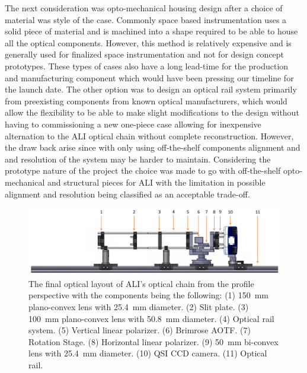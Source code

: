 The next consideration was opto-mechanical housing design after a choice of material was style of the case. Commonly space based instrumentation uses a solid piece of material and is machined into a shape required to be able to house all the optical components. However, this method is relatively expensive and is generally used for finalized space instrumentation and not for design concept prototypes. These types of cases also have a long lead-time for the production and manufacturing component which would have been pressing our timeline for the launch date. The other option was to design an optical rail system primarily from preexisting components from known optical manufacturers, which would allow the flexibility to be able to make slight modifications to the design without having to commissioning a new one-piece case allowing for inexpensive alternation to the ALI optical chain without complete reconstruction. However, the draw back arise since with only using off-the-shelf components alignment and and resolution of the system may be harder to maintain. Considering the prototype nature of the project the choice was made to go with off-the-shelf opto-mechanical and structural pieces for ALI with the limitation in possible alignment and resolution being classified as an acceptable trade-off.

\begin{figure}[h!]
    \begin{center}
    \includegraphics[width=1.0\textwidth]{./Images/3-3-OptoMechanicalSolidWorksLayoutProfile.pdf}
    \caption[ALI's Opto-mechanical Layout (Side)]{The final optical layout of ALI's optical chain from the profile perspective with the components being the following: (1) 150~mm plano-convex lens with 25.4~mm diameter. (2) Slit plate. (3) 100~mm plano-convex lens with 50.8~mm diameter. (4) Optical rail system. (5) Vertical linear polarizer. (6) Brimrose AOTF. (7) Rotation Stage. (8) Horizontal linear polarizer. (9) 50~mm bi-convex lens with 25.4~mm diameter. (10) QSI CCD camera. (11) Optical rail.}
   \label{fig:3.3:optoMechanicDesignSide}
    \end{center}
\end{figure}

